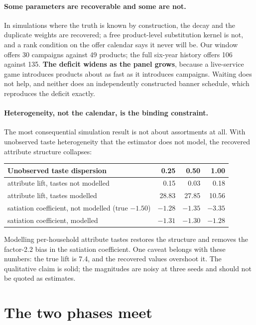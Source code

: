 \documentclass[11pt]{article}
\begin{document}
\paragraph{Some parameters are recoverable and some are not.} In simulations
where the truth is known by construction, the decay and the duplicate weights
are recovered; a free product-level substitution kernel is not, and a rank
condition on the offer calendar says it never will be. Our window offers 30
campaigns against 49 products; the full six-year history offers 106 against
135. \textbf{The deficit widens as the panel grows}, because a live-service
game introduces products about as fast as it introduces campaigns. Waiting does
not help, and neither does an independently constructed banner schedule, which
reproduces the deficit exactly.

\paragraph{Heterogeneity, not the calendar, is the binding constraint.} The
most consequential simulation result is not about assortments at all. With
unobserved taste heterogeneity that the estimator does not model, the recovered
attribute structure collapses:

\begin{center}\small
\begin{tabular}{lrrr}
\toprule
Unobserved taste dispersion & 0.25 & 0.50 & 1.00 \\
\midrule
attribute lift, tastes not modelled & 0.15 & 0.03 & 0.18 \\
attribute lift, tastes modelled & 28.83 & 27.85 & 10.56 \\
satiation coefficient, not modelled (true $-1.50$) & $-1.28$ & $-1.35$ &
$\mathbf{-3.35}$ \\
satiation coefficient, modelled & $-1.31$ & $-1.30$ & $-1.28$ \\
\bottomrule
\end{tabular}
\end{center}

\noindent Modelling per-household attribute tastes restores the structure and
removes the factor-2.2 bias in the satiation coefficient. One caveat belongs
with these numbers: the true lift is 7.4, and the recovered values overshoot
it. The qualitative claim is solid; the magnitudes are noisy at three seeds and
should not be quoted as estimates.

\section{The two phases meet}
\end{document}
